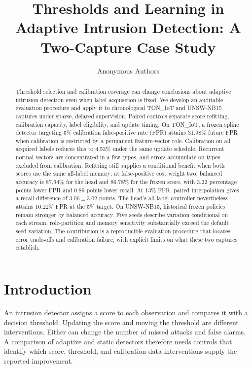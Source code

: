 
\title{Thresholds and Learning in Adaptive Intrusion Detection: A Two-Capture Case Study}
\ifdefined\AuthorVersion\else\author{Anonymous Authors}\fi

\begin{abstract}
Threshold selection and calibration coverage can change conclusions about adaptive intrusion detection even when label acquisition is fixed. We develop an auditable evaluation procedure and apply it to chronological TON\_IoT and UNSW-NB15 captures under sparse, delayed supervision. Paired controls separate score refitting, calibration capacity, label eligibility, and update timing. On TON\_IoT, a frozen spline detector targeting 5\% calibration false-positive rate (FPR) attains 31.98\% future FPR when calibration is restricted by a permanent feature-vector role. Calibration on all acquired labels reduces this to 4.53\% under the same update schedule. Recurrent normal vectors are concentrated in a few types, and errors accumulate on types excluded from calibration. Refitting still supplies a conditional benefit when both scores use the same all-label memory: at false-positive cost weight two, balanced accuracy is 87.94\% for the head and 86.78\% for the frozen score, with 3.22 percentage points lower FPR and 0.89 points lower recall. At 13\% FPR, paired interpolation gives a recall difference of $3.06\pm3.02$ points. The head's all-label controller nevertheless attains 10.22\% FPR at the 5\% target. On UNSW-NB15, historical frozen policies remain stronger by balanced accuracy. Five seeds describe variation conditional on each stream; role-partition and memory sensitivity substantially exceed the default seed variation. The contribution is a reproducible evaluation procedure that locates error trade-offs and calibration failure, with explicit limits on what these two captures establish.
\end{abstract}
\maketitle
\ifdefined\AuthorVersion\setauthorpdfmetadata\fi

\section{Introduction}
An intrusion detector assigns a score to each observation and compares it with a decision threshold. Updating the score and moving the threshold are different interventions. Either can change the number of missed attacks and false alarms. A comparison of adaptive and static detectors therefore needs controls that identify which score, threshold, and calibration-data interventions supply the reported improvement.

